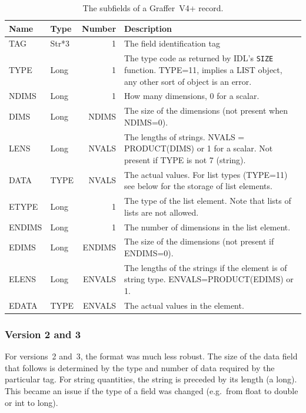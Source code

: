 \documentclass[english]{article}
\begin{document}
\begin{table}
  \centering
  \begin{tabular}{llrp{}}
    \hline
    Name & Type & Number & Description \\
    \hline
    TAG & Str*3 & 1 & The field identification tag \\
    TYPE & Long & 1 & The type code as returned by IDL's \texttt{SIZE}
    function. TYPE=11, implies a LIST object, any other sort of object
    is an error.\\
    NDIMS & Long & 1 & How many dimensions, 0 for a scalar.\\
    DIMS & Long & NDIMS & The size of the dimensions (not present when
    NDIMS=0).\\
    LENS & Long & NVALS & The lengths of strings. NVALS = PRODUCT(DIMS)
    or 1 for a scalar. Not present if TYPE is not 7 (string).\\
    DATA & TYPE & NVALS & The actual values. For list types (TYPE=11)
    see below for the storage of list elements.\\
    \hline
    ETYPE & Long & 1 & The type of the list element. Note that lists of
    lists are not allowed.\\
    ENDIMS & Long & 1 & The number of dimensions  in the list
    element.\\
    EDIMS &  Long & ENDIMS & The size of the dimensions (not present if
    ENDIMS=0).\\
    ELENS & Long & ENVALS & The lengths of the strings if the element
    is of string type. ENVALS=PRODUCT(EDIMS) or 1.\\
    EDATA & TYPE & ENVALS & The actual values in the element.\\
    \hline
  \end{tabular}
  \caption{The subfields of a Graffer~V4+ record.}
  \label{tab:graff_record}
\end{table}

\subsubsection{Version 2 and 3}
\label{sec:bin_v23}

For versions~2 and~3, the format was much less robust.
The size of the data field that follows is determined by the
type and number of data required by the particular tag. For string quantities,
the string is preceded by its length (a long). This became an issue if
the type of a field was changed (e.g.\ from float to double or int to long).
\end{document}
